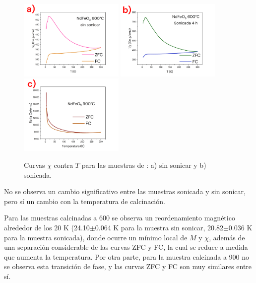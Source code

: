 \documentclass[../main.tex]{subfiles}
\begin{document}
\begin{figure}[H]
    \centering
    \includegraphics[width=0.45\textwidth]{fig/chivTNd.png}
    \quad
    \includegraphics[width=0.45\textwidth]{fig/chivTNd-S.png}
    \includegraphics[width=0.45\textwidth]{fig/chivTNd900.png}
    \caption{Curvas $\chi$ contra $T$ para las muestras de \neod{}: a) sin sonicar y b) sonicada.}
    \label{fig:chivTNd}
\end{figure}
No se observa un cambio significativo entre las muestras sonicada y sin sonicar, pero sí un cambio con la temperatura de calcinación.

Para las muestras calcinadas a 600\gradoC{} se observa un reordenamiento magnético alrededor de los 20 K (24.10$\pm$0.064 K para la muestra sin sonicar, 20.82$\pm$0.036 K para la muestra sonicada), donde ocurre un mínimo local de $M$ y $\chi$, además de una separación considerable de las curvas ZFC y FC, la cual se reduce a medida que aumenta la temperatura. Por otra parte, para la muestra calcinada a 900\gradoC{} no se observa esta transición de fase, y las curvas ZFC y FC son muy similares entre sí.
\end{document}
